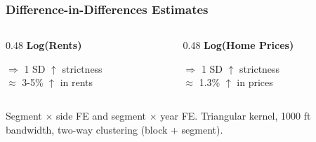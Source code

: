\begin{frame}
    \frametitle{Difference-in-Differences Estimates}
    
    \begin{columns}[T]
    \begin{column}{0.48\textwidth}
    \centering
    \textbf{Log(Rents)}
    \scriptsize
    
    \normalsize
    
    \vspace{0.5em}
    $\Rightarrow$ 1 SD $\uparrow$ strictness \\
    $\approx$ 3-5\% $\uparrow$ in rents
    \end{column}
    
    \begin{column}{0.48\textwidth}
    \centering
    \textbf{Log(Home Prices)}
    \scriptsize
    
    \normalsize
    
    \vspace{0.5em}
    $\Rightarrow$ 1 SD $\uparrow$ strictness \\
    $\approx$ 1.3\% $\uparrow$ in prices
    \end{column}
    \end{columns}
    
    \vspace{0.5em}
    \small
    Segment $\times$ side FE and segment $\times$ year FE. Triangular kernel, 1000 ft bandwidth, two-way clustering (block + segment).
    
    \hfill \hyperlink{price-balance}{}
\end{frame}
